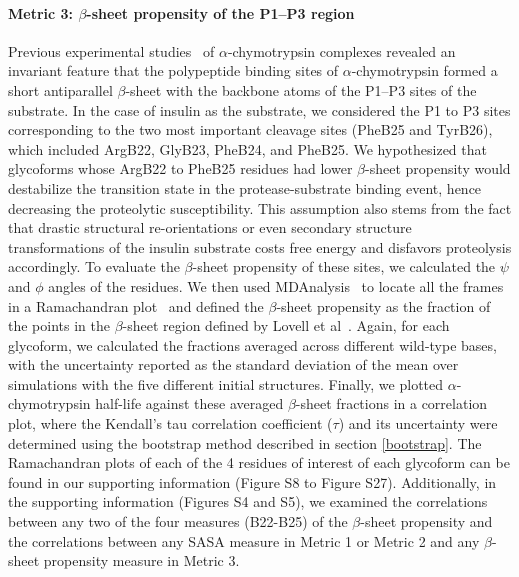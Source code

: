 \documentclass[sn-vancouver]{sn-jnl}
\begin{document}
\paragraph{Metric 3: \texorpdfstring{$\beta$}{Lg}-sheet propensity of the P1--P3 region}
Previous experimental studies~\cite{bode1993natural,hedstrom2002serine,coombs1999revisiting} of $\alpha$-chymotrypsin complexes revealed an invariant feature that the polypeptide binding sites of $\alpha$-chymotrypsin formed a short antiparallel $\beta$-sheet with the backbone atoms of the P1--P3 sites of the substrate. In the case of insulin as the substrate, we considered the P1 to P3 sites corresponding to the two most important cleavage sites (PheB25 and TyrB26), which included ArgB22, GlyB23, PheB24, and PheB25. We hypothesized that glycoforms whose ArgB22 to PheB25 residues had lower $\beta$-sheet propensity would destabilize the transition state in the protease-substrate binding event, hence decreasing the proteolytic susceptibility. This assumption also stems from the fact that drastic structural re-orientations or even secondary structure transformations of the insulin substrate costs free energy and disfavors proteolysis accordingly. To evaluate the $\beta$-sheet propensity of these sites, we calculated the $\psi$ and $\phi$ angles of the residues. We then used MDAnalysis~\cite{gowers2019mdanalysis, michaud2011mdanalysis} to locate all the frames in a Ramachandran plot~\cite{ramachandran1963stereochemistry} and defined the $\beta$-sheet propensity as the fraction of the points in the $\beta$-sheet region defined by Lovell et al~\cite{lovell2003structure}. Again, for each glycoform, we calculated the fractions averaged across different wild-type bases, with the uncertainty reported as the standard deviation of the mean over simulations with the five different initial structures. Finally, we plotted $\alpha$-chymotrypsin half-life against these averaged $\beta$-sheet fractions in a correlation plot, where the Kendall's tau correlation coefficient ($\tau$) and its uncertainty were determined using the bootstrap method described in section \ref{bootstrap}. The Ramachandran plots of each of the 4 residues of interest of each glycoform can be found in our supporting information (Figure S8 to Figure S27). Additionally, in the supporting information (Figures S4 and S5), we examined the correlations between any two of the four measures (B22-B25) of the $\beta$-sheet propensity and the correlations between any SASA measure in Metric 1 or Metric 2 and any $\beta$-sheet propensity measure in Metric 3. 
\end{document}
